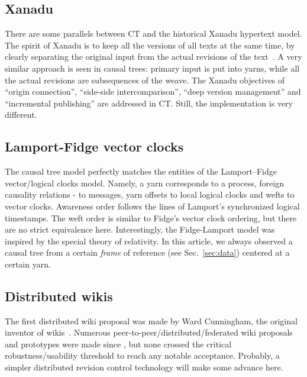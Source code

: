 \documentclass{sig-alternate}
\begin{document}
\subsection{Xanadu}

There are some parallels between CT and the historical Xanadu hypertext model.
The spirit of Xanadu is to keep all the versions of all texts at the same time, by clearly separating the original input from the actual revisions of the text~\cite{xanacarpet}.
A very similar  approach is seen in causal trees: primary input is put into yarns, while all the actual revisions are subsequences of the weave.
The Xanadu objectives of ``origin connection'', ``side-side intercomparison'', ``deep version management'' and ``incremental publishing'' are addressed in CT.
Still, the implementation is very different.

\subsection{Lamport-Fidge vector clocks} \label{sec:lamport}

The causal tree model perfectly matches the entities of the Lamport--Fidge~\cite{lamport,fidge} vector/logical clocks model.
Namely, a yarn corresponds to a process, foreign causality relations - to messages, yarn offsets to local logical clocks and wefts to vector clocks. 
Awareness order follows the lines of Lamport's synchronized logical timestamps.
The weft order is similar to Fidge's vector clock ordering, but there are no strict equivalence here.
Interestingly, the Fidge-Lamport model was inspired by the special theory of relativity.
In this article, we always observed a causal tree from a certain \emph{frame} of reference (see Sec.~\ref{sec:data}) centered at a certain yarn.

\subsection{Distributed wikis}

The first distributed wiki proposal was made by Ward Cunningham, the original inventor of wikis~\cite{folk-memory}.
Numerous peer-to-peer/distributed/federated wiki proposals and prototypes were made since \cite{www06,buraga,distriwiki,concerto}, but none crossed the critical robustness/usability threshold to reach any notable acceptance. Probably, a simpler distributed revision control technology will make some advance here.
\end{document}
